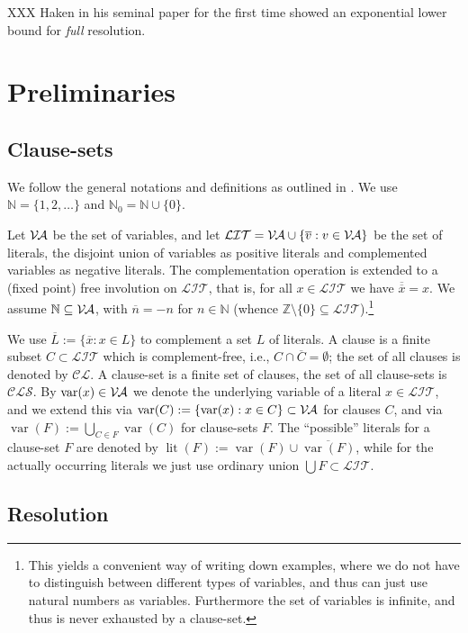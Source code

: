 \documentclass{report}
\newcommand{\set}[1]{\{ #1 \}}
\newcommand{\ol}{\overline}
\newcommand{\es}{\emptyset}
\newcommand{\sm}{\setminus}
\newcommand{\bc}{\bigcup}
\newcommand{\sse}{\subseteq}
\newcommand{\mc}{\mathcal}
\newcommand{\ZZ}{\mathbb{Z}}
\newcommand{\NN}{\mathbb{N}}
\newcommand{\NNZ}{\NN_0}
\newcommand{\Va}{\mc{V\hspace{-0.1em}A}}
\newcommand{\Lit}{\mc{LIT}}
\newcommand{\Cl}{\mc{CL}}
\newcommand{\Cls}{\mc{CLS}}
\DeclareMathOperator{\lit}{lit}
\DeclareMathOperator{\var}{var}
\begin{document}
XXX Haken in his seminal paper \cite{Haken1985Intractability} for the first time showed an exponential lower bound for \emph{full} resolution.



\chapter{Preliminaries}
\label{cha:Preliminaries}

\section{Clause-sets}
\label{clause-sets}

We follow the general notations and definitions as outlined in \cite{Kullmann2007HandbuchMU}. We use $\NN = \set{1,2,\dots}$ and $\NNZ = \NN \cup \set{0}$.

Let $\Va$ be the set of variables, and let $\Lit = \Va \cup \set{\ol{v} : v \in \Va}$ be the set of literals, the disjoint union of variables as positive literals and complemented variables as negative literals. The complementation operation is extended to a (fixed point) free involution on $\Lit$, that is, for all $x \in \Lit$ we have $\ol{\ol{x}} = x$. We assume $\NN \sse \Va$, with $\ol{n} = -n$ for $n \in \NN$ (whence $\ZZ \sm \set{0} \sse \Lit$).\footnote{This yields a convenient way of writing down examples, where we do not have to distinguish between different types of variables, and thus can just use natural numbers as variables. Furthermore the set of variables is infinite, and thus is never exhausted by a clause-set.}

We use $\ol{L} := \set{\ol{x} : x \in L}$ to complement a set $L$ of literals. A clause is a finite subset $C \subset \Lit$ which is complement-free, i.e., $C \cap \ol{C} = \es$; the set of all clauses is denoted by $\Cl$. A clause-set is a finite set of clauses, the set of all clause-sets is $\Cls$. By $\var(x) \in \Va$ we denote the underlying variable of a literal $x \in \Lit$, and we extend this via $\var(C) := \set{\var(x) : x \in C} \subset \Va$ for clauses $C$, and via $\var(F) := \bc_{C \in F} \var(C)$ for clause-sets $F$. The ``possible'' literals for a clause-set $F$ are denoted by $\lit(F) := \var(F) \cup \ol{\var(F)}$, while for the actually occurring literals we just use ordinary union $\bc F \subset \Lit$.


\section{Resolution}
\label{sec:Resolution}
\end{document}
